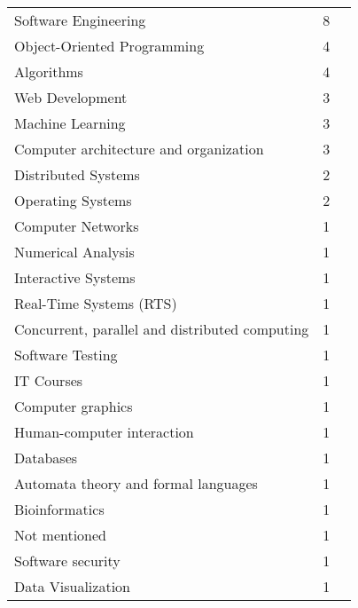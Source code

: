 \begin{table}[!htbp]
\begin{tabular}{@{}l c p{4cm}@{}}
		Software Engineering & 8 & \cite{farah2023prompting,hanifi2023chatgpt,kirova2024software,kruger2024performance,petrovska2024incorporating,rasnayaka2024empirical,rodriguezecheverria2024analysis,tanay2024exploratory} \\
		Object-Oriented Programming & 4 & \cite{cipriano2023gpt3,cipriano2024llms,kruger2024performance,pankiewicz2023large} \\
		Algorithms & 4 & \cite{jin2024teach,kuramitsu2023kogi,mendoncca2024evaluating,sterbini2024automated} \\
		Web Development & 3 & \cite{kruger2024performance,macneil2023experiences,rajala2023call} \\
		Machine Learning & 3 & \cite{drori2023human,reiche2024bridging,wolfer2024qualitative} \\
		Computer architecture and organization & 3 & \cite{gehringer2024dualsubmission,mendoncca2024evaluating,zhang2024assistant} \\
		Distributed Systems & 2 & \cite{arora2024analyzing,kruger2024performance} \\
		Operating Systems & 2 & \cite{agarwal2024which,kruger2024performance} \\
		Computer Networks & 1 & \cite{kruger2024performance} \\
		Numerical Analysis & 1 & \cite{kruger2024performance} \\
		Interactive Systems & 1 & \cite{kruger2024performance} \\
		Real-Time Systems (RTS) & 1 & \cite{kruger2024performance} \\
		Concurrent, parallel and distributed computing & 1 & \cite{estevezayres2024evaluation} \\
		Software Testing & 1 & \cite{jalil2023chatgpt} \\
		IT Courses & 1 & \cite{gumina2023teaching} \\
		Computer graphics & 1 & \cite{feng2024more} \\
		Human-computer interaction & 1 & \cite{freire2024may} \\
		Databases & 1 & \cite{prakash2024integrating} \\
		Automata theory and formal languages & 1 & \cite{mendoncca2024evaluating} \\
		Bioinformatics & 1 & \cite{piccolo2023evaluating} \\
		Not mentioned & 1 & \cite{babe2023studenteval} \\
		Software security & 1 & \cite{li2023evaluating} \\
		Data Visualization & 1 & \cite{kim2024chatgpt} \\
	\bottomrule
    \end{tabular}
    \label{tab:disciplines}
\end{table}